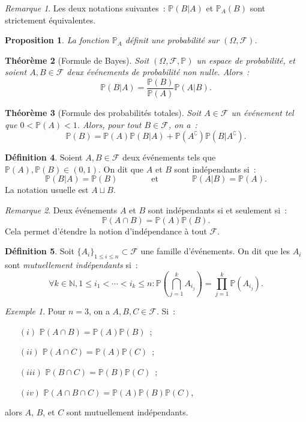 \documentclass{article}
\newcommand{\N}{\mathbb N}
\renewcommand{\P}{\mathbb P}
\newcommand{\espproba}[3]{\left(#1, #2, #3\right)}  %
\newcommand{\Ofp}{\espproba \Omega{\mathcal F}\P}  %
\newtheorem{thm}{Théorème}[section]
\newtheorem{prp}[thm]{Proposition}
\theoremstyle{definition}
\newtheorem{déf}[thm]{Définition}
\theoremstyle{remark}
\newtheorem*{rmq}{Remarque}
\newtheorem{ex}{Exemple}
\begin{document}
		\begin{rmq} Les deux notations suivantes~: $\P(B | A)$ et $\P_A(B)$ sont strictement équivalentes. \end{rmq}

		\begin{prp} La fonction $\P_A$ définit une probabilité sur $(\Omega, \mathcal F)$. \end{prp}

		\begin{thm}[Formule de Bayes] Soit $\Ofp$ un espace de probabilité, et soient $A, B \in \mathcal F$ deux événements de probabilité non nulle. Alors~:
		\[\P(B | A) = \frac {\P(B)}{\P(A)}\P(A | B).\]
		\end{thm}

		\begin{thm}[Formule des probabilités totales] Soit $A \in \mathcal F$ un événement tel que $0 < \P(A) < 1$. Alors, pour tout $B \in \mathcal F$, on a~:
		\[\P(B) = \P(A)\P(B|A) + \P(A^\complement)\P(B|A^\complement).\]
		\end{thm}

		\begin{déf} Soient $A, B \in \mathcal F$ deux événements tels que $\P(A), \P(B) \in (0, 1)$. On dit que $A$ et $B$ sont indépendants si~:
		\[\P(B|A) = \P(B)\qquad\qquad\text{et}\qquad\qquad\P(A|B)=\P(A).\]
		La notation usuelle est $A \sqcup B$.
		\end{déf}

		\begin{rmq} Deux événements $A$ et $B$ sont indépendants si et seulement si~:
		\[\P(A \cap B) = \P(A)\P(B).\]
		Cela permet d'étendre la notion d'indépendance à tout $\mathcal F$. \end{rmq}

		\begin{déf} Soit $\{A_i\}_{1 \leq i \leq n} \subset \mathcal F$ une famille d'événements. On dit que les $A_i$ sont \emph{mutuellement indépendants} si~:
		\[\forall k \in \N, 1 \leq i_1 < \dotsb < i_k \leq n : \P\left(\bigcap_{j=1}^kA_{i_j}\right) = \prod_{j=1}^k\P(A_{i_j}).\]
		\end{déf}

		\begin{ex} Pour $n=3$, on a $A, B, C \in \mathcal F$. Si~:
		\begin{itemize}
			\item[$(i)$] $\P(A \cap B) = \P(A)\P(B)$~;
			\item[$(ii)$] $\P(A \cap C) = \P(A)\P(C)$~;
			\item[$(iii)$] $\P(B \cap C) = \P(B)\P(C)$~;
			\item[$(iv)$] $\P(A \cap B \cap C) = \P(A)\P(B)\P(C)$,
		\end{itemize}
		alors $A$, $B$, et $C$ sont mutuellement indépendants.
		\end{ex}
\end{document}
